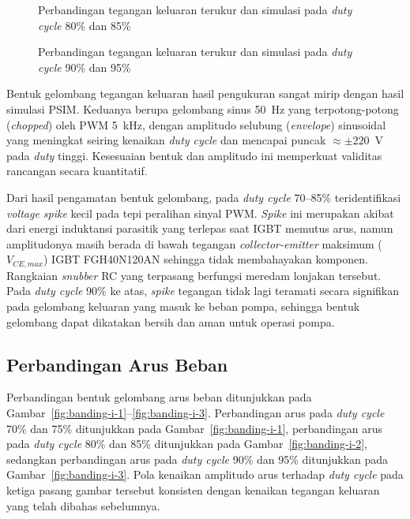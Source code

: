 \begin{figure}[H]
  \centering
  \hfill{}\par\medskip
  \hfill{}
  \caption{Perbandingan tegangan keluaran terukur dan simulasi pada \emph{duty
  cycle} 80\% dan 85\%}
  \label{fig:banding-v-2}
\end{figure}


\begin{figure}[H]
  \centering
  \hfill{}\par\medskip
  \hfill{}
  \caption{Perbandingan tegangan keluaran terukur dan simulasi pada \emph{duty
  cycle} 90\% dan 95\%}
  \label{fig:banding-v-3}
\end{figure}

Bentuk gelombang tegangan keluaran hasil pengukuran sangat mirip dengan hasil
simulasi PSIM. Keduanya berupa gelombang sinus 50~Hz yang terpotong-potong
(\emph{chopped}) oleh PWM 5~kHz, dengan amplitudo selubung (\emph{envelope})
sinusoidal yang meningkat seiring kenaikan \emph{duty cycle} dan mencapai puncak
$\approx\pm220$~V pada \emph{duty} tinggi. Kesesuaian bentuk dan amplitudo ini
memperkuat validitas rancangan secara kuantitatif.

Dari hasil pengamatan bentuk gelombang, pada \emph{duty cycle} 70--85\%
teridentifikasi \emph{voltage spike} kecil pada tepi peralihan sinyal PWM.
\emph{Spike} ini merupakan akibat dari energi induktansi parasitik yang
terlepas saat IGBT memutus arus, namun amplitudonya masih berada di bawah
tegangan \emph{collector-emitter} maksimum ($V_{CE,max}$) IGBT FGH40N120AN
sehingga tidak membahayakan komponen. Rangkaian \emph{snubber} RC yang terpasang
berfungsi meredam lonjakan tersebut. Pada \emph{duty cycle} 90\% ke atas,
\emph{spike} tegangan tidak lagi teramati secara signifikan pada gelombang
keluaran yang masuk ke beban pompa, sehingga bentuk gelombang dapat dikatakan
bersih dan aman untuk operasi pompa.

\subsection{Perbandingan Arus Beban}
\label{sec:banding-arus}

Perbandingan bentuk gelombang arus beban ditunjukkan pada
Gambar~\ref{fig:banding-i-1}--\ref{fig:banding-i-3}. Perbandingan arus pada
\emph{duty cycle} 70\% dan 75\% ditunjukkan pada Gambar~\ref{fig:banding-i-1},
perbandingan arus pada \emph{duty cycle} 80\% dan 85\% ditunjukkan pada
Gambar~\ref{fig:banding-i-2}, sedangkan perbandingan arus pada \emph{duty
cycle} 90\% dan 95\% ditunjukkan pada Gambar~\ref{fig:banding-i-3}. Pola
kenaikan amplitudo arus terhadap \emph{duty cycle} pada ketiga pasang gambar
tersebut konsisten dengan kenaikan tegangan keluaran yang telah dibahas
sebelumnya.

